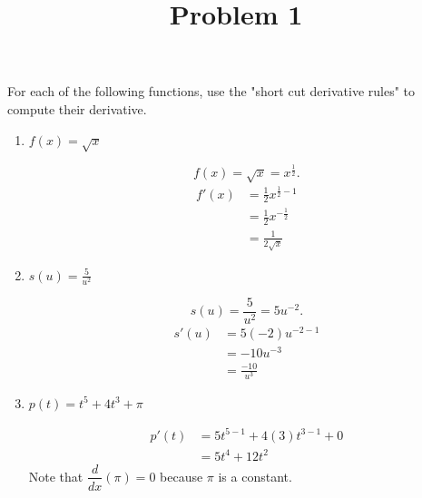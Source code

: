 \documentclass{ximera}
\title[Problem 1]{Problem 1}
\begin{document}
\begin{abstract} \end{abstract}
\maketitle


\begin{problem}
For each of the following functions, use the "short cut derivative rules" to compute their derivative.
	
	\begin{enumerate}
	
	\item $f(x) = \sqrt{x}$
	\begin{explanation}
		$$f(x) = \sqrt{x} = x^{\frac{1}{2}}.$$ 
		\begin{align*}
		f'(x) &= \frac{1}{2} x^{\frac{1}{2} - 1}\\
		&= \frac{1}{2} x^{-\frac{1}{2}} \\
		&= \frac{1}{2\sqrt{x}}
		\end{align*}
		\end{explanation}
			

	\item $s(u) = \frac{5}{u^2}$
	\begin{explanation}
		$$s(u) = \frac{5}{u^2} = 5u^{-2}.$$  
		\begin{align*}
		s'(u) &= 5(-2) u^{-2-1}\\
		 &= -10u^{-3}\\
		&= \frac{-10}{u^3} 
		\end{align*}
		\end{explanation}
			
			

	\item $p(t) = t^5 + 4t^3 + \pi $
	\begin{explanation}
		\begin{align*}
		p'(t) &= 5t^{5-1} + 4(3)t^{3-1} + 0\\ 
		&= 5t^4 + 12t^2
		\end{align*}  
		Note that $\dfrac{d}{dx} (\pi) = 0$ because $\pi$ is a constant.	
		\end{explanation}
			
			
	\end{enumerate}
\end{problem}
\end{document}
